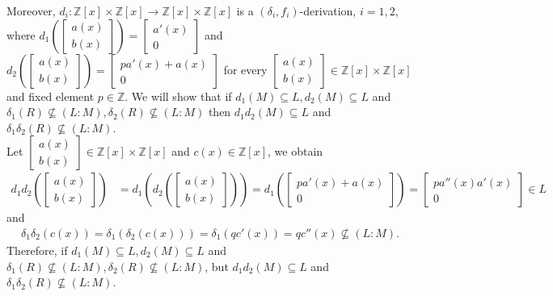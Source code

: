 \documentclass{arxiv}
\begin{document}
\begin{example}
        
    Moreover, $d_i : \mathbb{Z}[x] \times \mathbb{Z}[x] \rightarrow \mathbb{Z}[x] \times \mathbb{Z}[x]$  is a $(\delta_i,f_i)$-derivation, $i=1,2$, where $d_1 \left( \begin{bmatrix}
        a(x)\\
        b(x)
    \end{bmatrix} \right) = \begin{bmatrix}
        a'(x)\\
       0
    \end{bmatrix}$ and $d_2 \left( \begin{bmatrix}
        a(x)\\
        b(x)
    \end{bmatrix} \right) = \begin{bmatrix}
        pa'(x) + a(x)\\
        0
    \end{bmatrix}$ for every $\begin{bmatrix}
        a(x)\\
        b(x)
    \end{bmatrix} \in \mathbb{Z}[x] \times \mathbb{Z}[x]$ and fixed element $p \in \mathbb{Z}$. We will show that if $d_1(M) \subseteq L, d_2 (M) \subseteq L$ and $\delta_1(R) \nsubseteq (L:M), \delta_2(R) \nsubseteq (L:M)$ then $d_1d_2(M) \subseteq L$ and $\delta_1 \delta_2 (R) \nsubseteq (L:M)$.\\
    Let $\begin{bmatrix}
        a(x)\\
        b(x)
    \end{bmatrix} \in \mathbb{Z}[x] \times \mathbb{Z}[x]$ and $c(x) \in \mathbb{Z}[x]$, we obtain
    \begin{align*}
        d_1d_2 \left( \begin{bmatrix}
        a(x)\\
        b(x)
    \end{bmatrix} \right)
    &= d_1 \left( d_2 \left( \begin{bmatrix}
        a(x)\\
        b(x)
    \end{bmatrix} \right) \right) 
    = d_1 \left( \begin{bmatrix}
        pa'(x)+a(x)\\
        0
    \end{bmatrix} \right)
    = \begin{bmatrix}
        pa''(x)a'(x)\\
        0
    \end{bmatrix} \in L
    \end{align*}
    and
    \begin{align*}
        \delta_1\delta_2(c(x))= \delta_1(\delta_2(c(x)))= \delta_1(qc'(x))=qc''(x) \nsubseteq (L:M).
    \end{align*}
    Therefore, if $d_1(M) \subseteq L, d_2 (M) \subseteq L$ and $\delta_1(R) \nsubseteq (L:M), \delta_2(R) \nsubseteq (L:M)$, but $d_1d_2(M) \subseteq L$ and $\delta_1 \delta_2 (R) \nsubseteq (L:M)$.
\end{example}
\end{document}
